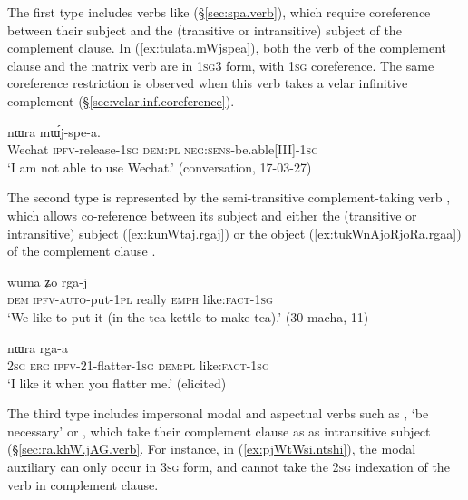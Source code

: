 The first type includes verbs like  (§\ref{sec:spa.verb}), which require coreference between their subject and the (transitive or intransitive) subject of the complement clause. In (\ref{ex:tulata.mWjspea}), both the verb of the complement clause and the matrix verb are in \textsc{1sg}\fl{}3 form, with \textsc{1sg} coreference. The same coreference restriction is observed when this verb takes a velar infinitive complement (§\ref{sec:velar.inf.coreference}).
 
\begin{exe}
\ex \label{ex:tulata.mWjspea}
  nɯra mɯ́j-spe-a. \\
 Wechat \textsc{ipfv}-release-\textsc{1sg} \textsc{dem}:\textsc{pl} \textsc{neg}:\textsc{sens}-be.able[III]-\textsc{1sg} \\
 \glt `I am not able to use Wechat.' (conversation, 17-03-27)
  \end{exe}
 
The second type is represented by the semi-transitive complement-taking verb , which allows co-reference between its subject and either the (transitive or intransitive) subject (\ref{ex:kunWtaj.rgaj}) or the object (\ref{ex:tukWnAjoRjoRa.rgaa}) of the complement clause \citep[238]{jacques16complementation}. 
   
\begin{exe}
\ex \label{ex:kunWtaj.rgaj}
 \gll [nɯ ku-nɯ-ta-j] wuma ʑo rga-j   \\
 \textsc{dem} \textsc{ipfv}-\textsc{auto}-put-\textsc{1pl} really \textsc{emph} like:\textsc{fact}-\textsc{1sg} \\
 \glt `We like to put it (in the tea kettle to make tea).' (30-macha, 11)
\end{exe}
     
 \begin{exe}
\ex \label{ex:tukWnAjoRjoRa.rgaa}
  nɯra rga-a \\
 \textsc{2sg} \textsc{erg} \textsc{ipfv}-2\fl{}1-flatter-\textsc{1sg} \textsc{dem}:\textsc{pl}  like:\textsc{fact}-\textsc{1sg}\\
\glt `I like it when you flatter me.' (elicited)
 \end{exe}
 
 The third type includes impersonal modal and aspectual verbs such as , `be necessary' or , which take their complement clause as as intransitive subject (§\ref{sec:ra.khW.jAG.verb}. For instance, in (\ref{ex:pjWtWsi.ntshi}), the modal auxiliary  can only occur in \textsc{3sg} form, and cannot take the \textsc{2sg} indexation of the verb in complement clause.
 
